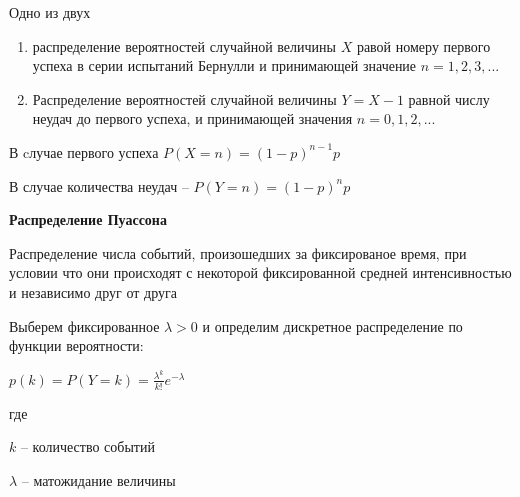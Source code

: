 Одно из двух

\begin{enumerate}
	\item распределение вероятностей случайной величины $X$ равой номеру первого успеха в серии испытаний Бернулли и принимающей значение $n = 1, 2, 3,...$
	\item Распределение вероятностей случайной величины $Y = X - 1$ равной числу неудач до первого успеха, и принимающей значения $n = 0, 1, 2,...$
\end{enumerate}

В cлучае первого успеха $P(X = n) = (1 - p)^{n - 1}p$

В случае количества неудач -- $P(Y = n) = (1 - p)^n p$


{\bf Распределение Пуассона}

Распределение числа событий, произошедших за фиксированое время, при условии что они происходят с некоторой фиксированной средней интенсивностью и независимо друг от друга

Выберем фиксированное $\lambda > 0$ и определим дискретное распределение по функции вероятности:

$p(k) = P(Y = k) = \frac{\lambda^k}{k!}e^{-\lambda}$

где 

$k$ -- количество событий

$\lambda$ -- матожидание величины 